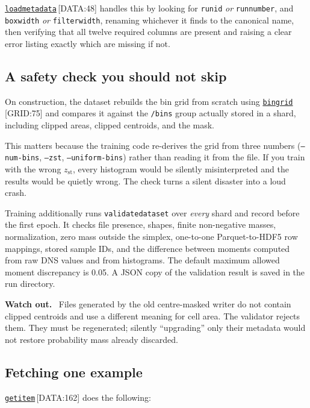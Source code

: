 \documentclass[11pt,a4paper]{report}
\newcommand{\srcbase}{vscode://file/Users/syellapa/Documents/Research/2026/ANSYS/Multi-ScalarPDF}
\newcommand{\dmdn}{dirichlet\string_mdn}
\newcommand{\srctag}[1]{{\footnotesize\textcolor{TagGray}{[#1]}}}
\newcommand{\Grid}[2]{\href{\srcbase/\dmdn/bin\string_grid.py:#1}{\texttt{#2}}\,\srctag{GRID:#1}}
\newcommand{\Data}[2]{\href{\srcbase/\dmdn/data.py:#1}{\texttt{#2}}\,\srctag{DATA:#1}}
\newcommand{\code}[1]{\texttt{#1}}
\renewcommand{\_}{\origtextunderscore\allowbreak}
\newlength{\calloutwidth}
\newcommand{\calloutOpen}{%
  \par\medskip\noindent
  \setlength{\calloutwidth}{\dimexpr\linewidth-2\fboxsep\relax}%
  \begin{lrbox}{\calloutbox}\begin{minipage}{\calloutwidth}}
\newcommand{\calloutClose}[1]{%
  \end{minipage}\end{lrbox}\colorbox{#1}{\usebox{\calloutbox}}\par\medskip}
\newenvironment{caution}
  {\calloutOpen\textbf{Watch out.}\ }
  {\calloutClose{WarnBG}}
\begin{document}
\Data{48}{load\_metadata} handles this by looking for \code{run\_id} \emph{or}
\code{run\_number}, and \code{box\_width} \emph{or} \code{filter\_width}, renaming whichever it
finds to the canonical name, then verifying that all twelve required columns are present and
raising a clear error listing exactly which are missing if not.

\subsection*{A safety check you should not skip}

On construction, the dataset rebuilds the bin grid from
scratch using \Grid{75}{bin\_grid} and compares it against the \code{/bins} group actually
stored in a shard, including clipped areas, clipped centroids, and the mask.

This matters because the training code re-derives the grid from three numbers
(\code{--num-bins}, \code{--zst}, \code{--uniform-bins}) rather than reading it from the file.
If you train with the wrong $z_{\text{st}}$, every histogram would be silently misinterpreted
and the results would be quietly wrong. The check turns a silent disaster into a loud crash.

Training additionally runs \code{validate\_dataset} over \emph{every} shard and record before
the first epoch. It checks file presence, shapes, finite non-negative masses, normalization,
zero mass outside the simplex, one-to-one Parquet-to-HDF5 row mappings, stored sample IDs, and
the difference between moments computed from raw DNS values and from histograms. The default
maximum allowed moment discrepancy is 0.05. A JSON copy of the validation result is saved in
the run directory.

\begin{caution}
Files generated by the old centre-masked writer do not contain clipped centroids and use a
different meaning for cell area. The validator rejects them. They must be regenerated; silently
``upgrading'' only their metadata would not restore probability mass already discarded.
\end{caution}

\subsection*{Fetching one example}

\Data{162}{\_\_getitem\_\_} does the following:
\end{document}
